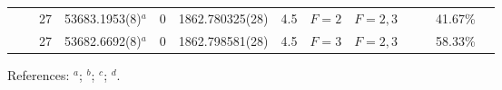 \begin{table*}
\begin{center}
{\begin{tabular}{:l;l;c;l;c;l;c;l;l;c;c;c;c}
\rowstyle{\itshape}               &        & 27        & 53683.1953(8)$^{a}$              & 0 &   1862.780325(28)  &  4.5 & $F=2                                     $ & $F=2,3                                   $ &             &              & 41.67\%   & $     ^{}     $\\
\rowstyle{\itshape}               &        & 27        & 53682.6692(8)$^{a}$              & 0 &   1862.798581(28)  &  4.5 & $F=3                                     $ & $F=2,3                                   $ &             &              & 58.33\%   & $     ^{}     $\\
\hline
\end{tabular}
}
{\footnotesize References:
$^{a}$\citet{Griesmann:2000:L113};
$^{b}$\citet{Angstmann:2004:014102};
$^{c}$\citet{Savukov:2008:042501};
$^{d}$\citet{Dzuba:2007:062510}.}
\end{center}
\end{table*}
